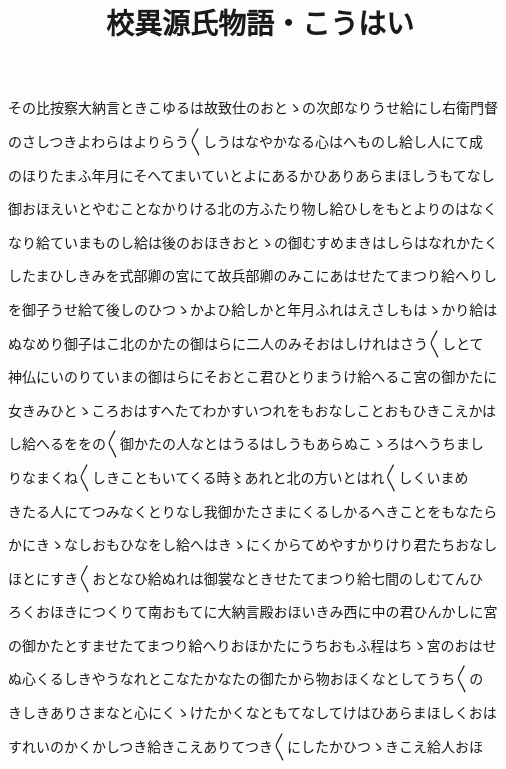 \documentclass[a4paper,11pt,landscape]{ltjtarticle}
\title{校異源氏物語・こうはい}
\date{}
\begin{document}
\maketitle

その比按察大納言ときこゆるは故致仕のおとゝの次郎なりうせ給にし右衛門督
\par\medskip
のさしつきよわらはよりらう〱しうはなやかなる心はへものし給し人にて成
\par\medskip
のほりたまふ年月にそへてまいていとよにあるかひありあらまほしうもてなし
\par\medskip
御おほえいとやむことなかりける北の方ふたり物し給ひしをもとよりのはなく
\par\medskip
なり給ていまものし給は後のおほきおとゝの御むすめまきはしらはなれかたく
\par\medskip
したまひしきみを式部卿の宮にて故兵部卿のみこにあはせたてまつり給へりし
\par\medskip
を御子うせ給て後しのひつゝかよひ給しかと年月ふれはえさしもはゝかり給は
\par\medskip
ぬなめり御子はこ北のかたの御はらに二人のみそおはしけれはさう〱しとて
\par\medskip
神仏にいのりていまの御はらにそおとこ君ひとりまうけ給へるこ宮の御かたに
\par\medskip
女きみひとゝころおはすへたてわかすいつれをもおなしことおもひきこえかは
\par\medskip
し給へるををの〱御かたの人なとはうるはしうもあらぬこゝろはへうちまし
\par\medskip
りなまくね〱しきこともいてくる時〻あれと北の方いとはれ〱しくいまめ
\par\medskip
きたる人にてつみなくとりなし我御かたさまにくるしかるへきことをもなたら
\par\medskip
かにきゝなしおもひなをし給へはきゝにくからてめやすかりけり君たちおなし
\par\medskip
ほとにすき〱おとなひ給ぬれは御裳なときせたてまつり給七間のしむてんひ
\par\medskip
ろくおほきにつくりて南おもてに大納言殿おほいきみ西に中の君ひんかしに宮
\par\medskip
の御かたとすませたてまつり給へりおほかたにうちおもふ程はちゝ宮のおはせ
\par\medskip
ぬ心くるしきやうなれとこなたかなたの御たから物おほくなとしてうち〱の
\par\medskip
きしきありさまなと心にくゝけたかくなともてなしてけはひあらまほしくおは
\par\medskip
すれいのかくかしつき給きこえありてつき〱にしたかひつゝきこえ給人おほ
\end{document}
